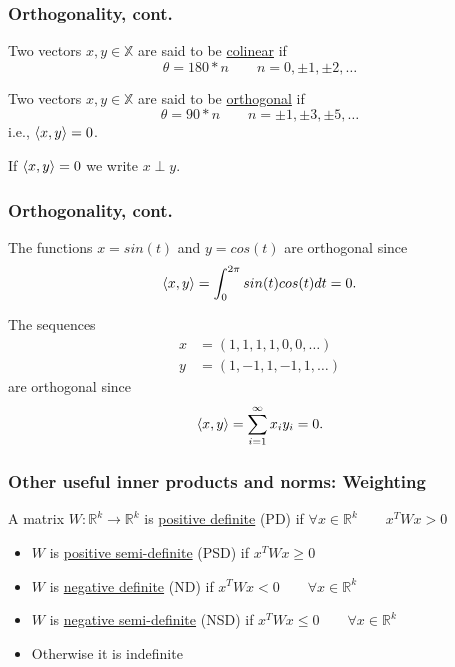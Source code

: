 \documentclass{beamer}
\begin{document}
\begin{frame}\frametitle{Orthogonality, cont.}

\begin{definition}[Colinear]
Two vectors $x,y \in \mathbb{X}$ are said to be \underline{colinear} if 
\[ 
\theta = 180*n \qquad n = 0, \pm 1, \pm 2, \ldots 
\]
\end{definition}

\begin{definition}[Orthogonal] 
Two vectors $x,y \in \mathbb{X}$ are said to be \underline{orthogonal} if 
\[ 
\theta = 90*n \qquad n = \pm 1, \pm 3, \pm 5, \ldots 
\]
i.e., $\left< x,y \right> = 0$.
\end{definition}

\vspace{1cm}

If $\left< x,y \right> = 0$ we write $x \perp y$.\\

\end{frame}

\begin{frame}\frametitle{Orthogonality, cont.}

\begin{example}[Vectors in $L_2[0,2\pi)$]
The functions $x=sin(t)$ and $y = cos(t)$ are orthogonal since 
\[ 
\left< x,y \right> = \int_{0}^{2\pi}sin(t)cos(t)dt = 0.
\]
\end{example}

\begin{example}
The sequences 
\begin{align*}
x &= (1, 1, 1, 1, 0, 0, \dots ) \\	
y &= (1, -1, 1, -1, 1, \dots)
\end{align*}
are orthogonal since 
\[ 
\left< x,y \right> = \sum_{i=1}^\infty x_i y_i = 0.
\]
\end{example}
\end{frame}

\begin{frame}\frametitle{Other useful inner products and norms: Weighting}
\begin{definition}
A matrix $W : \mathbb{R}^k \to \mathbb{R}^k$ is \underline{positive definite} (PD) if $\forall x \in \mathbb{R}^k \quad \quad x^TWx > 0$\\
\begin{itemize}
  \item $W$ is \underline{positive semi-definite} (PSD) if $x^TWx \geq 0$
  \item $W$ is \underline{negative definite} (ND) if $x^TWx < 0 \qquad \forall x \in \mathbb{R}^k$
  \item $W$ is \underline{negative semi-definite} (NSD) if $x^TWx \leq 0 \qquad \forall x \in \mathbb{R}^k$
  \item Otherwise it is indefinite
\end{itemize}
\end{definition}
\end{frame}
\end{document}
